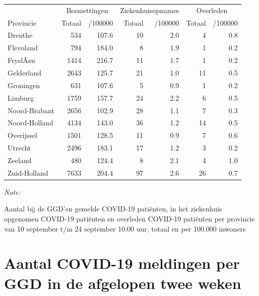 \documentclass[
  english,
  man,floatsintext]{apa6}
\begin{document}
\begin{table}
\centering
\begin{threeparttable}
\begin{tabular}{lrrrrrr}
\toprule
\multicolumn{1}{c}{ } & \multicolumn{2}{c}{Besmettingen} & \multicolumn{2}{c}{Ziekenhuisopnames} & \multicolumn{2}{c}{Overleden} \\
\cmidrule(l{3pt}r{3pt}){2-3} \cmidrule(l{3pt}r{3pt}){4-5} \cmidrule(l{3pt}r{3pt}){6-7}
Provincie & Totaal & /100000 & Totaal & /100000 & Totaal & /100000\\
\midrule
Drenthe & 534 & 107.6 & 10 & 2.0 & 4 & 0.8\\
Flevoland & 794 & 184.0 & 8 & 1.9 & 1 & 0.2\\
FryslÃ¢n & 1414 & 216.7 & 11 & 1.7 & 1 & 0.2\\
Gelderland & 2643 & 125.7 & 21 & 1.0 & 11 & 0.5\\
Groningen & 631 & 107.6 & 5 & 0.9 & 1 & 0.2\\
Limburg & 1759 & 157.7 & 24 & 2.2 & 6 & 0.5\\
Noord-Brabant & 2656 & 102.9 & 28 & 1.1 & 7 & 0.3\\
Noord-Holland & 4134 & 143.0 & 36 & 1.2 & 14 & 0.5\\
Overijssel & 1501 & 128.5 & 11 & 0.9 & 7 & 0.6\\
Utrecht & 2496 & 183.1 & 17 & 1.2 & 3 & 0.2\\
Zeeland & 480 & 124.4 & 8 & 2.1 & 4 & 1.0\\
Zuid-Holland & 7633 & 204.4 & 97 & 2.6 & 26 & 0.7\\
\bottomrule
\end{tabular}
\begin{tablenotes}
\item \textit{Note: } 
\item Aantal bij de GGD’en gemelde COVID-19 patiënten, in het ziekenhuis opgenomen COVID-19 patiënten en overleden COVID-19 patiënten per provincie van 10 september t/m 24 september 10:00 uur, totaal en per 100.000 inwoners
\end{tablenotes}
\end{threeparttable}
\end{table}

\newpage

\hypertarget{aantal-covid-19-meldingen-per-ggd-in-de-afgelopen-twee-weken}{%
\section{Aantal COVID-19 meldingen per GGD in de afgelopen twee weken}\label{aantal-covid-19-meldingen-per-ggd-in-de-afgelopen-twee-weken}}
\end{document}
